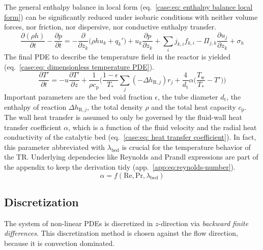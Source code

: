 \noindent
The general enthalpy balance in local form (eq.~\ref{case:eq: enthalpy balance local form}) can be significantly reduced under isobaric conditions with neither volume forces,
nor friction, nor dispersive, nor conductive enthalpy transfer.
\begin{equation}
    \label{case:eq: enthalpy balance local form}
    \frac{\partial (\rho h)}{\partial t} - \frac{\partial p }{\partial t} = 
    -\frac{\partial}{\partial z_k} \bigg (\rho h u_k + q_k' \bigg) + 
    u_k \frac{\partial p}{\partial z_k} + \sum_i j_{k,i} f_{k,i} -
    \Pi_{j,k} \frac{\partial u_j}{\partial z_k} + \sigma_h
\end{equation}
\noindent
The final PDE to describe the temperature field in the reactor is yielded (eq.~\ref{case:eq: dimensionless temperature PDE}).
\begin{equation}
    \label{case:eq: dimensionless temperature PDE}
    \frac{\partial T'}{\partial t} = -u \frac{\partial T'}{\partial z} +
    \frac{1}{\rho c_\text{p}} \bigg ( \frac{1-\epsilon}{T_*} \sum_j (-\Delta h_{\text{R},j}) r_j
    + \frac{4}{d_\text{t}}  \alpha \big (\frac{T_\text{w}}{T_*} - T' \big) \bigg)
\end{equation}
Important parameters are the bed void fraction $\epsilon$, the tube diameter $d_\text{t}$, the enthalpy of reaction
$\Delta h_{\text{R}, j}$, the total density $\rho$ and the total heat capacity $c_\text{p}$. The wall heat transfer
is assumed to only be governed by the fluid-wall heat transfer coefficient $\alpha$, which is a function
of the fluid velocity and the radial heat conductivity of the catalytic bed (eq.~\ref{case:eq: heat transfer coefficient}).
In fact, this parameter abbreviated
with $\lambda_\text{bed}$ is crucial for the temperature behavior of the TR. Underlying dependecies like
Reynolds and Prandl expressions are part of the appendix to keep the derivation tidy (app.~\ref{app:eq:reynolds-number}).
\begin{equation}
    \label{case:eq: heat transfer coefficient}
    \alpha = f(\mathrm{Re}, \mathrm{Pr}, \lambda_\text{bed})
\end{equation}

\subsection{Discretization}

The system of non-linear PDEs is discretized in $z$-direction via \emph{backward finite differences}.
This discretization method is chosen against the flow direction, because it is convection dominated.

